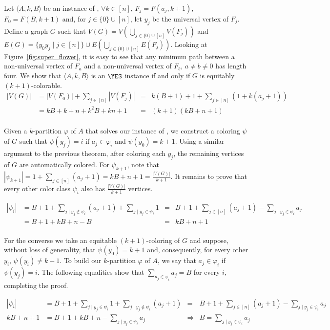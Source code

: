 \begin{tproof}
    Let $\langle A,k,B\rangle$ be an instance of , $\forall k \in [n]$, $F_j = F(a_j, k+1)$, $F_0 = F(B, k+1)$ and, for $j \in \{0\} \cup [n]$, let $y_j$ be the universal vertex of $F_j$.
    Define a graph $G$ such that $V(G) = V\left(\bigcup_{j \in \{0\} \cup [n]} V(F_j)\right)$ and $E(G) = \{y_0y_j \mid j \in [n]\} \cup E\left(\bigcup_{j \in \{0\} \cup [n]} E(F_j)\right)$.
    Looking at Figure~\ref{fig:super_flower}, it is easy to see that any minimum path between a non-universal vertex of $F_a$ and a non-universal vertex of $F_b$, $a \neq b \neq 0$ has length four.
    We show that $\langle A,k,B\rangle$ is an $\YES$ instance if and only if $G$ is equitably $(k+1)$-colorable.
    \begin{align*}
        |V(G)| &= |V(F_0)| + \sum_{j \in [n]} |V(F_j)| &= &k(B + 1) + 1 + \sum_{j \in [n]} \left(1 + k(a_j + 1)\right)\\
               &= kB + k + n + k^2B + kn + 1           &= &(k+1)(kB + n + 1)\\
    \end{align*}
    
    Given a $k$-partition $\varphi$ of $A$ that solves our instance of , we construct a coloring $\psi$ of $G$ such that $\psi(y_j) = i$ if $a_j \in \varphi_i$ and $\psi(y_0) = k+1$.
    Using a similar argument to the previous theorem, after coloring each $y_j$, the remaining vertices of $G$ are automatically colored.
    For $\psi_{k+1}$, note that $|\psi_{k+1}| = 1 + \sum_{j \in [n]} (a_j + 1) = kB + n + 1 = \frac{|V(G)|}{k+1}$.
    It remains to prove that every other color class $\psi_i$ also has $\frac{|V(G)|}{k+1}$ vertices.
    
    \begin{align*}
        |\psi_i| &= B + 1 + \sum_{j \mid y_j \notin \psi_i} (a_j + 1) + \sum_{j \mid y_j \in \psi_i} 1 &= &B + 1 + \sum_{j \in [n]} (a_j + 1) - \sum_{j \mid y_j \in \psi_i} a_j\\
                 &= B + 1 + kB + n - B &= &kB + n + 1\\
    \end{align*}
    
    For the converse we take an equitable $(k+1)$-coloring of $G$ and suppose, without loss of generality, that $\psi(y_0) = k+1$ and, consequently, for every other $y_i$, $\psi(y_i) \neq k+1$.
    To build our $k$-partition $\varphi$ of $A$, we say that $a_j \in \varphi_i$ if $\psi(y_j) = i$.
    The following equalities show that $\sum_{a_j \in \varphi_i} a_j = B$ for every $i$, completing the proof.
    
    \begin{align*}
        |\psi_i|  &= B + 1 + \sum_{j \mid y_j \in \psi_i} 1 + \sum_{j \mid y_j \notin \psi_i} (a_j + 1) &= &B + 1 + \sum_{j \in [n]} (a_j + 1) - \sum_{j \mid y_j \in \psi_i} a_j \\
        kB + n + 1 &= B + 1 + kB + n - \sum_{j \mid y_j \in \psi_i} a_j &\Rightarrow &B =  \sum_{j \mid y_j \in \psi_i} a_j
    \end{align*}
\end{tproof}

